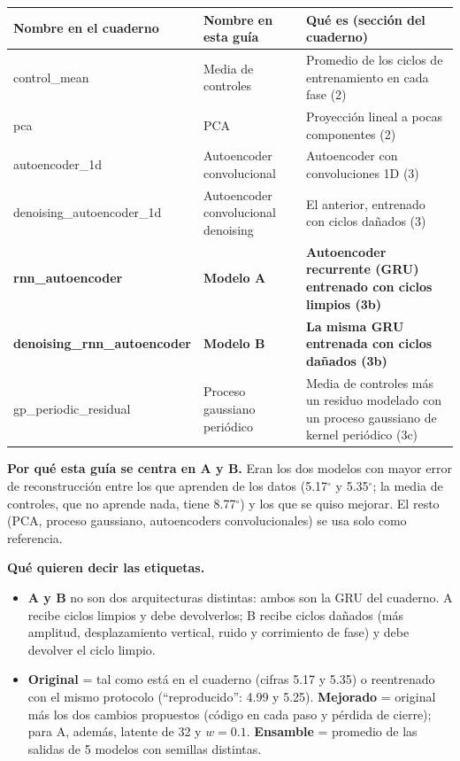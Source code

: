 \documentclass[11pt,a4paper]{article}
\newcommand{\gr}{$^\circ$}
\begin{document}
\begin{center}
\small
\begin{tabularx}{\textwidth}{@{}>{\ttfamily\raggedright\arraybackslash}p{4.4cm}>{\raggedright\arraybackslash}p{3.5cm}>{\raggedright\arraybackslash}X@{}}
\toprule
\textnormal{\textbf{Nombre en el cuaderno}} & \textbf{Nombre en esta guía} & \textbf{Qué es (sección del cuaderno)} \\
\midrule
control\_mean & Media de controles & Promedio de los ciclos de entrenamiento en cada fase (2) \\
pca & PCA & Proyección lineal a pocas componentes (2) \\
autoencoder\_1d & Autoencoder convolucional & Autoencoder con convoluciones 1D (3) \\
denoising\_autoencoder\_1d & Autoencoder convolucional denoising & El anterior, entrenado con ciclos dañados (3) \\
\textbf{rnn\_autoencoder} & \textbf{Modelo A} & \textbf{Autoencoder recurrente (GRU) entrenado con ciclos limpios (3b)} \\
\textbf{denoising\_rnn\_autoencoder} & \textbf{Modelo B} & \textbf{La misma GRU entrenada con ciclos dañados (3b)} \\
gp\_periodic\_residual & Proceso gaussiano periódico & Media de controles más un residuo modelado con un proceso gaussiano de kernel periódico (3c) \\
\bottomrule
\end{tabularx}
\end{center}

\textbf{Por qué esta guía se centra en A y B.} Eran los dos modelos con mayor error de reconstrucción entre los que aprenden de los datos (5.17\gr{} y 5.35\gr{}; la media de controles, que no aprende nada, tiene 8.77\gr{}) y los que se quiso mejorar. El resto (PCA, proceso gaussiano, autoencoders convolucionales) se usa solo como referencia.

\textbf{Qué quieren decir las etiquetas.}
\begin{itemize}
\item \textbf{A y B} no son dos arquitecturas distintas: ambos son la GRU del cuaderno. A recibe ciclos limpios y debe devolverlos; B recibe ciclos dañados (más amplitud, desplazamiento vertical, ruido y corrimiento de fase) y debe devolver el ciclo limpio.
\item \textbf{Original} = tal como está en el cuaderno (cifras 5.17 y 5.35) o reentrenado con el mismo protocolo (``reproducido'': 4.99 y 5.25). \textbf{Mejorado} = original más los dos cambios propuestos (código en cada paso y pérdida de cierre); para A, además, latente de 32 y $w=0.1$. \textbf{Ensamble} = promedio de las salidas de 5 modelos con semillas distintas.
\end{itemize}
\end{document}
